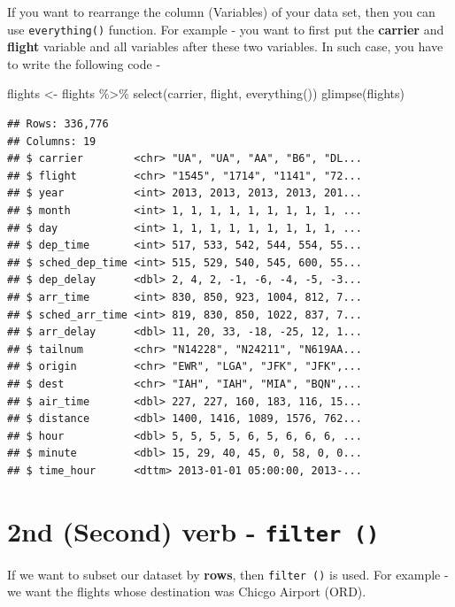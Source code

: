 \documentclass[
]{book}
\newenvironment{Shaded}{\begin{snugshade}}{\end{snugshade}}
\newcommand{\FunctionTok}[1]{\textcolor[rgb]{0.00,0.00,0.00}{#1}}
\newcommand{\NormalTok}[1]{#1}
\newcommand{\OtherTok}[1]{\textcolor[rgb]{0.56,0.35,0.01}{#1}}
\newcommand{\SpecialCharTok}[1]{\textcolor[rgb]{0.00,0.00,0.00}{#1}}
\begin{document}
If you want to rearrange the column (Variables) of your data set, then you can use \texttt{everything()} function. For example - you want to first put the \textbf{carrier} and \textbf{flight} variable and all variables after these two variables. In such case, you have to write the following code -

\begin{Shaded}
\begin{Highlighting}[]
\NormalTok{flights }\OtherTok{\textless{}{-}}\NormalTok{ flights }\SpecialCharTok{\%\textgreater{}\%} 
  \FunctionTok{select}\NormalTok{(carrier, flight, }\FunctionTok{everything}\NormalTok{())}
\FunctionTok{glimpse}\NormalTok{(flights)}
\end{Highlighting}
\end{Shaded}

\begin{verbatim}
## Rows: 336,776
## Columns: 19
## $ carrier        <chr> "UA", "UA", "AA", "B6", "DL...
## $ flight         <chr> "1545", "1714", "1141", "72...
## $ year           <int> 2013, 2013, 2013, 2013, 201...
## $ month          <int> 1, 1, 1, 1, 1, 1, 1, 1, 1, ...
## $ day            <int> 1, 1, 1, 1, 1, 1, 1, 1, 1, ...
## $ dep_time       <int> 517, 533, 542, 544, 554, 55...
## $ sched_dep_time <int> 515, 529, 540, 545, 600, 55...
## $ dep_delay      <dbl> 2, 4, 2, -1, -6, -4, -5, -3...
## $ arr_time       <int> 830, 850, 923, 1004, 812, 7...
## $ sched_arr_time <int> 819, 830, 850, 1022, 837, 7...
## $ arr_delay      <dbl> 11, 20, 33, -18, -25, 12, 1...
## $ tailnum        <chr> "N14228", "N24211", "N619AA...
## $ origin         <chr> "EWR", "LGA", "JFK", "JFK",...
## $ dest           <chr> "IAH", "IAH", "MIA", "BQN",...
## $ air_time       <dbl> 227, 227, 160, 183, 116, 15...
## $ distance       <dbl> 1400, 1416, 1089, 1576, 762...
## $ hour           <dbl> 5, 5, 5, 5, 6, 5, 6, 6, 6, ...
## $ minute         <dbl> 15, 29, 40, 45, 0, 58, 0, 0...
## $ time_hour      <dttm> 2013-01-01 05:00:00, 2013-...
\end{verbatim}

\hypertarget{nd-second-verb---filter}{%
\section{\texorpdfstring{2nd (Second) verb - \texttt{filter\ ()}}{2nd (Second) verb - filter ()}}\label{nd-second-verb---filter}}

If we want to subset our dataset by \textbf{rows}, then \texttt{filter\ ()} is used. For example - we want the flights whose destination was Chicgo Airport (ORD).
\end{document}
